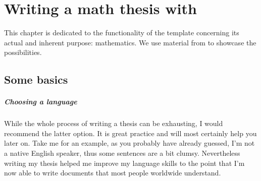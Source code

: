 \chapter{Writing a math thesis with \texttt{\classname}}\label{ch:math}
This chapter is dedicated to the functionality of the template concerning its actual and 
inherent purpose: mathematics. We use material from \cite{Evans15} to showcase 
the possibilities.
\section{Some basics}
\paragraph{Choosing a language}
While the whole process 
of writing a thesis can be exhausting, I would recommend the latter option. It is great 
practice and will most certainly help you later on. Take me for an example, as you 
probably have already guessed, I'm not a native English speaker, thus some sentences 
are a bit clumsy. Nevertheless writing my thesis helped me improve my language skills 
to the point that I'm now able to write documents that most people worldwide understand.
